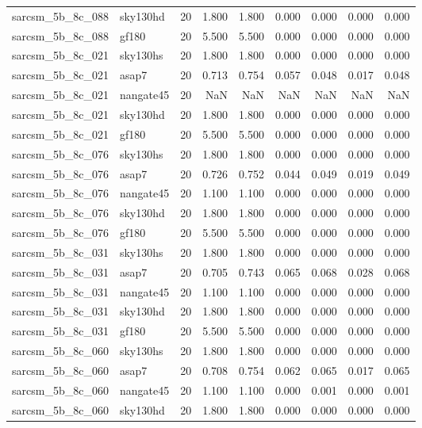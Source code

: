 \begin{tabular}{llrrrrrrr}
sarcsm\_5b\_8c\_088 & sky130hd & 20 & 1.800 & 1.800 & 0.000 & 0.000 & 0.000 & 0.000 \\
sarcsm\_5b\_8c\_088 & gf180 & 20 & 5.500 & 5.500 & 0.000 & 0.000 & 0.000 & 0.000 \\
sarcsm\_5b\_8c\_021 & sky130hs & 20 & 1.800 & 1.800 & 0.000 & 0.000 & 0.000 & 0.000 \\
sarcsm\_5b\_8c\_021 & asap7 & 20 & 0.713 & 0.754 & 0.057 & 0.048 & 0.017 & 0.048 \\
sarcsm\_5b\_8c\_021 & nangate45 & 20 & NaN & NaN & NaN & NaN & NaN & NaN \\
sarcsm\_5b\_8c\_021 & sky130hd & 20 & 1.800 & 1.800 & 0.000 & 0.000 & 0.000 & 0.000 \\
sarcsm\_5b\_8c\_021 & gf180 & 20 & 5.500 & 5.500 & 0.000 & 0.000 & 0.000 & 0.000 \\
sarcsm\_5b\_8c\_076 & sky130hs & 20 & 1.800 & 1.800 & 0.000 & 0.000 & 0.000 & 0.000 \\
sarcsm\_5b\_8c\_076 & asap7 & 20 & 0.726 & 0.752 & 0.044 & 0.049 & 0.019 & 0.049 \\
sarcsm\_5b\_8c\_076 & nangate45 & 20 & 1.100 & 1.100 & 0.000 & 0.000 & 0.000 & 0.000 \\
sarcsm\_5b\_8c\_076 & sky130hd & 20 & 1.800 & 1.800 & 0.000 & 0.000 & 0.000 & 0.000 \\
sarcsm\_5b\_8c\_076 & gf180 & 20 & 5.500 & 5.500 & 0.000 & 0.000 & 0.000 & 0.000 \\
sarcsm\_5b\_8c\_031 & sky130hs & 20 & 1.800 & 1.800 & 0.000 & 0.000 & 0.000 & 0.000 \\
sarcsm\_5b\_8c\_031 & asap7 & 20 & 0.705 & 0.743 & 0.065 & 0.068 & 0.028 & 0.068 \\
sarcsm\_5b\_8c\_031 & nangate45 & 20 & 1.100 & 1.100 & 0.000 & 0.000 & 0.000 & 0.000 \\
sarcsm\_5b\_8c\_031 & sky130hd & 20 & 1.800 & 1.800 & 0.000 & 0.000 & 0.000 & 0.000 \\
sarcsm\_5b\_8c\_031 & gf180 & 20 & 5.500 & 5.500 & 0.000 & 0.000 & 0.000 & 0.000 \\
sarcsm\_5b\_8c\_060 & sky130hs & 20 & 1.800 & 1.800 & 0.000 & 0.000 & 0.000 & 0.000 \\
sarcsm\_5b\_8c\_060 & asap7 & 20 & 0.708 & 0.754 & 0.062 & 0.065 & 0.017 & 0.065 \\
sarcsm\_5b\_8c\_060 & nangate45 & 20 & 1.100 & 1.100 & 0.000 & 0.001 & 0.000 & 0.001 \\
sarcsm\_5b\_8c\_060 & sky130hd & 20 & 1.800 & 1.800 & 0.000 & 0.000 & 0.000 & 0.000 \\

\end{tabular}
